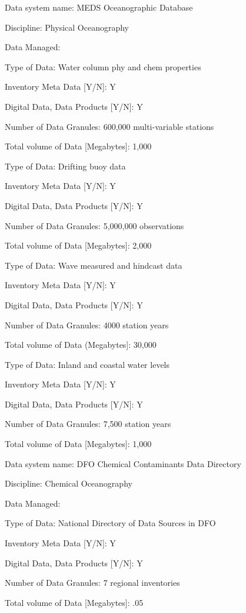 \begin{description}

\item{Data system name:}  MEDS Oceanographic Database
\item{Discipline:}  Physical Oceanography
\item{Data Managed:}
	\begin{description}
	\item{Type of Data:}  Water column phy and chem properties
	\item{Inventory Meta Data [Y/N]:}  Y
	\item{Digital Data, Data Products [Y/N]:}  Y
	\item{Number of Data Granules:}  600,000 multi-variable stations
	\item{Total volume of Data [Megabytes]:}  1,000
\medskip
	\item{Type of Data:}  Drifting buoy data
	\item{Inventory Meta Data [Y/N]:}  Y
	\item{Digital Data, Data Products [Y/N]:}  Y
	\item{Number of Data Granules:}  5,000,000 observations
	\item{Total volume of Data [Megabytes]:}  2,000
\medskip
	\item{Type of Data:}  Wave measured and hindcast data
	\item{Inventory Meta Data [Y/N]:}  Y
	\item{Digital Data, Data Products [Y/N]:}  Y
	\item{Number of Data Granules:}  4000 station years
	\item{Total volume of Data (Megabytes]:}  30,000
\medskip
	\item{Type of Data:}  Inland and coastal water levels
	\item{Inventory Meta Data [Y/N]:}  Y
	\item{Digital Data, Data Products [Y/N]:}  Y
	\item{Number of Data Granules:}  7,500 station years
	\item{Total volume of Data [Megabytes]:}  1,000
	\end{description}
\medskip
\item{Data system name:}  DFO Chemical Contaminants Data Directory
\item{Discipline:}  Chemical Oceanography
\item{Data Managed:}
	\begin{description}
	\item{Type of Data:}  National Directory of Data Sources in DFO
	\item{Inventory Meta Data [Y/N]:}  Y
	\item{Digital Data, Data Products [Y/N]:}  Y
	\item{Number of Data Granules:}  7 regional inventories
	\item{Total volume of Data [Megabytes]:}  .05
	\end{description}
\end{description}

